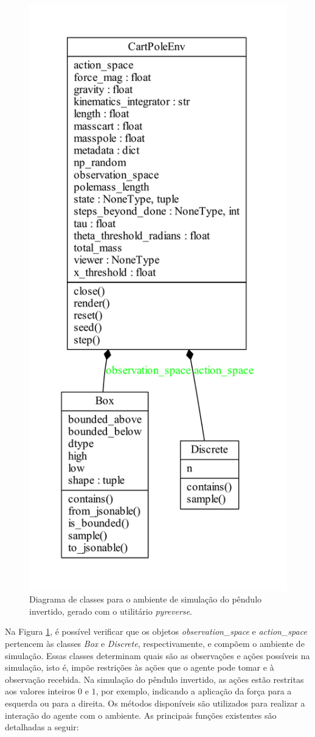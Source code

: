 \begin{figure}[H]
\centering
\includegraphics[width=0.5\linewidth]{02_desenvolvimento/02_PInv_Fig_ClassUML.pdf}
\caption{Diagrama de classes para o ambiente de simulação do pêndulo invertido, gerado com o utilitário \textit{pyreverse}.}\label{fig:2gym-umlclasse}
\end{figure}

Na Figura \ref{fig:2gym-umlclasse}, é possível verificar que os objetos \textit{observation\_space} e \textit{action\_space} pertencem às classes \textit{Box} e \textit{Discrete}, respectivamente, e compõem o ambiente de simulação. Essas classes determinam quais são as observações e ações possíveis na simulação, isto é, impõe restrições às ações que o agente pode tomar e à observação recebida. Na simulação do pêndulo invertido, as ações estão restritas aos valores inteiros $0$ e $1$, por exemplo, indicando a aplicação da força para a esquerda ou para a direita. Os métodos disponíveis são utilizados para realizar a interação do agente com o ambiente. As principais funções existentes são detalhadas a seguir:

